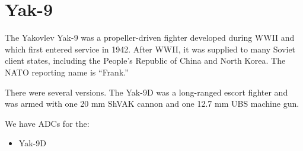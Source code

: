 \section*{Yak-9}

The Yakovlev Yak-9 was a propeller-driven fighter developed during WWII and which first entered service in 1942. After WWII, it was supplied to many Soviet client states, including the People's Republic of China and North Korea. The NATO reporting name is “Frank.”

There were several versions. The Yak-9D was a long-ranged escort fighter and was armed with one 20 mm ShVAK cannon and one 12.7 mm UBS machine gun.

We have ADCs for the:
\begin{itemize}
\item Yak-9D
\end{itemize}
